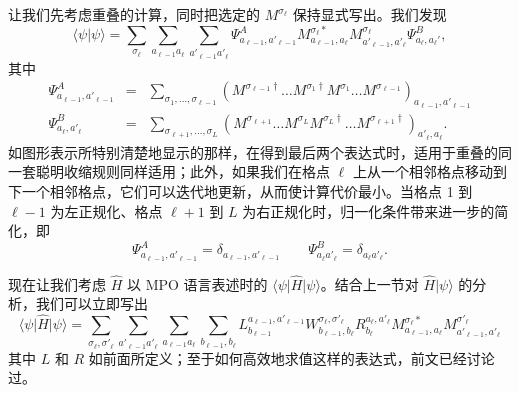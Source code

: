 \documentclass[a4paper,10pt,oneside,onecolumn,1p,times]{elsarticle}
\newcommand{\bra}[1]{\mbox{$\langle #1  |$}}
\newcommand{\ket}[1]{\mbox{$| #1  \rangle$}}
\newcommand{\braket}[2]{\mbox{$\langle #1  | #2 \rangle$}} 	%
\begin{document}
让我们先考虑重叠的计算，同时把选定的 $M^{\sigma_\ell}$ 保持显式写出。我们发现
\begin{equation}
\braket{\psi}{\psi} = \sum_{\sigma_\ell} \sum_{a_{\ell-1}a_{\ell}} \sum_{a'_{\ell-1}a'_{\ell}} \Psi^A_{a_{\ell-1},a'_{\ell-1}} M^{\sigma_\ell*}_{a_{\ell-1}, a_{\ell}} M^{\sigma_\ell}_{a'_{\ell-1}, a'_{\ell}} \Psi^B_{a_\ell, a_\ell'},
\end{equation}
其中
\begin{eqnarray}
\Psi^A_{a_{\ell-1},a'_{\ell-1}} &=& \sum_{\sigma_1,\ldots,\sigma_{\ell-1}} (M^{\sigma_{\ell-1}\dagger} \ldots M^{\sigma_1\dagger} M^{\sigma_1} \ldots M^{\sigma_{\ell-1}})_{a_{\ell-1},a'_{\ell-1}} \\
\Psi^B_{a_\ell, a'_\ell} &=& \sum_{\sigma_{\ell+1},\ldots,\sigma_L} (M^{\sigma_{\ell+1}} \ldots M^{\sigma_L} M^{\sigma_L\dagger} \ldots M^{\sigma_{\ell+1}\dagger})_{a'_\ell,a_\ell} .
\end{eqnarray}
如图形表示所特别清楚地显示的那样，在得到最后两个表达式时，适用于重叠的同一套聪明收缩规则同样适用；此外，如果我们在格点 $\ell$ 上从一个相邻格点移动到下一个相邻格点，它们可以迭代地更新，从而使计算代价最小。当格点 1 到 $\ell-1$ 为左正规化、格点 $\ell+1$ 到 $L$ 为右正规化时，归一化条件带来进一步的简化，即
\begin{equation} 
\Psi^A_{a_{\ell-1},a'_{\ell-1}} = \delta_{a_{\ell-1},a'_{\ell-1}} \quad\quad  \Psi^B_{a_\ell a'_\ell} = \delta_{a_\ell a'_\ell} .
\end{equation}

现在让我们考虑 $\hat{H}$ 以 MPO 语言表述时的 $\bra{\psi} \hat{H} \ket{\psi}$。结合上一节对 $\hat{H}\ket{\psi}$ 的分析，我们可以立即写出
\begin{equation}
\bra{\psi} \hat{H} \ket{\psi} = \sum_{\sigma_\ell,\sigma'_\ell} \sum_{a'_{\ell-1}a'_{\ell}}  \sum_{a_{\ell-1}a_{\ell}} \sum_{b_{\ell-1},b_\ell} L^{a_{\ell-1},a'_{\ell-1}}_{b_{\ell-1}} W^{\sigma_\ell,\sigma'_\ell}_{b_{\ell-1},b_\ell} R^{a_\ell,a'_\ell}_{b_\ell} M^{\sigma_\ell*}_{a_{\ell-1},a_\ell} M^{\sigma'_\ell}_{a'_{\ell-1},a'_\ell} 
\end{equation}
其中 $L$ 和 $R$ 如前面所定义；至于如何高效地求值这样的表达式，前文已经讨论过。
\end{document}
